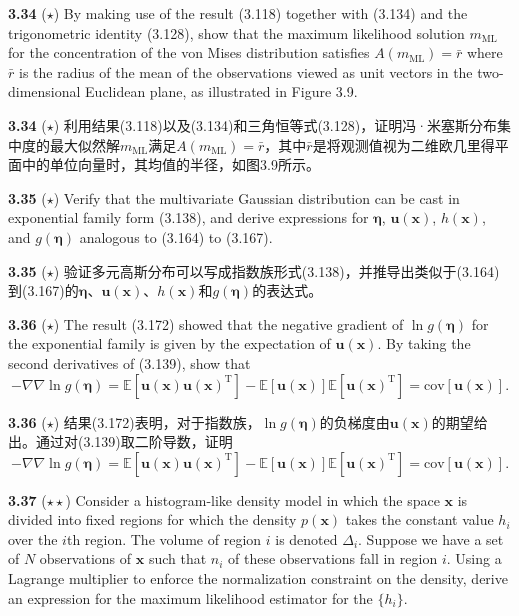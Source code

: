 \documentclass{article}
\begin{document}
\textbf{3.34} ($\star$) By making use of the result (3.118) together with (3.134) and the trigonometric identity (3.128), show that the maximum likelihood solution $m_{\text{ML}}$ for the concentration of the von Mises distribution satisfies $A(m_{\text{ML}}) = \bar{r}$ where $\bar{r}$ is the radius of the mean of the observations viewed as unit vectors in the two-dimensional Euclidean plane, as illustrated in Figure 3.9.

\textbf{3.34} ($\star$) 利用结果(3.118)以及(3.134)和三角恒等式(3.128)，证明冯·米塞斯分布集中度的最大似然解$m_{\text{ML}}$满足$A(m_{\text{ML}}) = \bar{r}$，其中$\bar{r}$是将观测值视为二维欧几里得平面中的单位向量时，其均值的半径，如图3.9所示。

\textbf{3.35} ($\star$) Verify that the multivariate Gaussian distribution can be cast in exponential family form (3.138), and derive expressions for $\boldsymbol{\eta}$, $\mathbf{u}(\mathbf{x})$, $h(\mathbf{x})$, and $g(\boldsymbol{\eta})$ analogous to (3.164) to (3.167).

\textbf{3.35} ($\star$) 验证多元高斯分布可以写成指数族形式(3.138)，并推导出类似于(3.164)到(3.167)的$\boldsymbol{\eta}$、$\mathbf{u}(\mathbf{x})$、$h(\mathbf{x})$和$g(\boldsymbol{\eta})$的表达式。

\textbf{3.36} ($\star$) The result (3.172) showed that the negative gradient of $\ln g(\boldsymbol{\eta})$ for the exponential family is given by the expectation of $\mathbf{u}(\mathbf{x})$. By taking the second derivatives of (3.139), show that
\begin{equation}
-\nabla\nabla \ln g(\boldsymbol{\eta}) = \mathbb{E}[\mathbf{u}(\mathbf{x})\mathbf{u}(\mathbf{x})^\mathrm{T}] - \mathbb{E}[\mathbf{u}(\mathbf{x})]\mathbb{E}[\mathbf{u}(\mathbf{x})^\mathrm{T}] = \text{cov}[\mathbf{u}(\mathbf{x})]. \tag{3.218}
\end{equation}

\textbf{3.36} ($\star$) 结果(3.172)表明，对于指数族，$\ln g(\boldsymbol{\eta})$的负梯度由$\mathbf{u}(\mathbf{x})$的期望给出。通过对(3.139)取二阶导数，证明
\begin{equation}
-\nabla\nabla \ln g(\boldsymbol{\eta}) = \mathbb{E}[\mathbf{u}(\mathbf{x})\mathbf{u}(\mathbf{x})^\mathrm{T}] - \mathbb{E}[\mathbf{u}(\mathbf{x})]\mathbb{E}[\mathbf{u}(\mathbf{x})^\mathrm{T}] = \text{cov}[\mathbf{u}(\mathbf{x})]. \tag{3.218}
\end{equation}

\textbf{3.37} ($\star\star$) Consider a histogram-like density model in which the space $\mathbf{x}$ is divided into fixed regions for which the density $p(\mathbf{x})$ takes the constant value $h_i$ over the $i$th region. The volume of region $i$ is denoted $\Delta_i$. Suppose we have a set of $N$ observations of $\mathbf{x}$ such that $n_i$ of these observations fall in region $i$. Using a Lagrange multiplier to enforce the normalization constraint on the density, derive an expression for the maximum likelihood estimator for the $\{h_i\}$.
\end{document}
